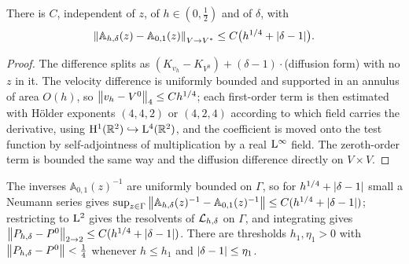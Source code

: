 \begin{lemma}
  \label{lem:local:form-small}
  \leanok
  There is $C$, independent of $z$, of $h\in(0,\tfrac12)$ and of $\delta$, with
  \begin{equation}
    \left\|\mathbb A_{h,\delta}(z)-\mathbb A_{0,1}(z)\right\|_{V\to V^*}
    \leq C\bigl(h^{1/4}+\left\lvert\delta-1\right\rvert\bigr).
    \label{eq:local:form-small}
  \end{equation}
\end{lemma}

\begin{proof}
  \leanok
  The difference splits as $(K_{v_h}-K_{V^0})+(\delta-1)\cdot$(diffusion form) with no $z$
  in it.  The velocity difference is uniformly bounded and supported in an annulus of area
  $O(h)$, so $\left\|v_h-V^0\right\|_4\leq Ch^{1/4}$; each first-order term is then estimated with
  H\"older exponents $(4,4,2)$ or $(4,2,4)$ according to which field carries the
  derivative, using $\mathrm{H}^1(\mathbb{R}^2)\hookrightarrow\mathrm{L}^4(\mathbb{R}^2)$, and the coefficient is moved
  onto the test function by self-adjointness of multiplication by a real $\mathrm{L}^\infty$
  field.  The zeroth-order term is bounded the same way and the diffusion difference
  directly on $V\times V$.
\end{proof}

\begin{lemma}
  \label{lem:local:riesz-perturbation}
  \leanok
  The inverses $\mathbb A_{0,1}(z)^{-1}$ are uniformly bounded on $\Gamma$, so for
  $h^{1/4}+\left\lvert\delta-1\right\rvert$ small a Neumann series gives
  $\sup_{z\in\Gamma}\left\|\mathbb A_{h,\delta}(z)^{-1}-\mathbb A_{0,1}(z)^{-1}\right\|
  \leq C(h^{1/4}+\left\lvert\delta-1\right\rvert)$; restricting to $\mathrm{L}^2$ gives the resolvents of
  $\mathcal{L}_{h,\delta}$ on $\Gamma$, and integrating gives
  $\left\|P_{h,\delta}-P^0\right\|_{2\to2}\leq C(h^{1/4}+\left\lvert\delta-1\right\rvert)$.  There are thresholds
  $h_1,\eta_1>0$ with $\left\|P_{h,\delta}-P^0\right\|<\tfrac14$ whenever $h\leq h_1$ and
  $\left\lvert\delta-1\right\rvert\leq\eta_1$.
\end{lemma}

